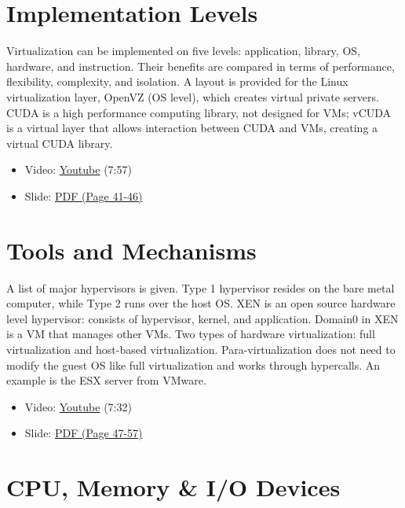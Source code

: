 \section{Implementation Levels}\label{implementation-levels}

Virtualization can be implemented on five levels: application, library,
OS, hardware, and instruction. Their benefits are compared in terms of
performance, flexibility, complexity, and isolation. A layout is
provided for the Linux virtualization layer, OpenVZ (OS level), which
creates virtual private servers. CUDA is a high performance computing
library, not designed for VMs; vCUDA is a virtual layer that allows
interaction between CUDA and VMs, creating a virtual CUDA library.

\begin{itemize}
\tightlist
\item
  Video: \href{https://www.youtube.com/watch?v=Le-kv-eAhvg}{Youtube}
  (7:57)
\item
  Slide:
  \href{https://drive.google.com/open?id=0B88HKpainTSfQU1uQmxZWHdWQ1k}{PDF
  (Page 41-46)}
\end{itemize}

\section{Tools and Mechanisms}\label{tools-and-mechanisms}

A list of major hypervisors is given. Type 1 hypervisor resides on the
bare metal computer, while Type 2 runs over the host OS. XEN is an open
source hardware level hypervisor: consists of hypervisor, kernel, and
application. Domain0 in XEN is a VM that manages other VMs. Two types of
hardware virtualization: full virtualization and host-based
virtualization. Para-virtualization does not need to modify the guest OS
like full virtualization and works through hypercalls. An example is the
ESX server from VMware.

\begin{itemize}
\tightlist
\item
  Video: \href{https://www.youtube.com/watch?v=VYz5rp5HDVE}{Youtube}
  (7:32)
\item
  Slide:
  \href{https://drive.google.com/open?id=0B88HKpainTSfQU1uQmxZWHdWQ1k}{PDF
  (Page 47-57)}
\end{itemize}

\section{CPU, Memory \& I/O Devices}\label{cpu-memory-io-devices}


